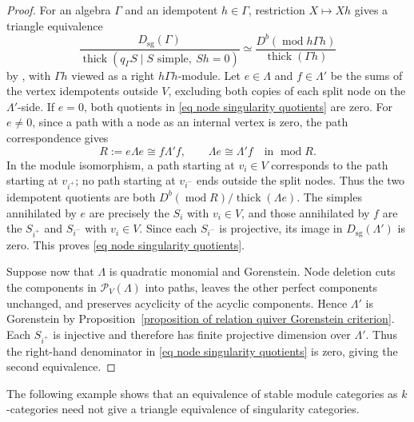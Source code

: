 \documentclass[11pt]{article}
\renewcommand{\mod}{\operatorname{mod}}
\providecommand{\varLambda}{\Lambda}
\providecommand{\varGamma}{\Gamma}
\theoremstyle{definition}
\begin{document}
			\begin{proof}
				For an algebra $\varGamma$ and an idempotent $h\in\varGamma$, restriction $X\mapsto Xh$ gives a triangle equivalence
				\[
					\frac{D_{\mathrm{sg}}(\varGamma)}
					{\operatorname{thick}(q_{\varGamma}S\mid
						S\text{ simple},\ Sh=0)}
					\simeq
					\frac{D^b(\mod h\varGamma h)}
					{\operatorname{thick}(\varGamma h)}
				\]
				by \cite[Proposition~3.3]{KY16}, with $\varGamma h$ viewed as a right $h\varGamma h$-module.
				Let $e\in\varLambda$ and $f\in\varLambda'$ be the sums of the vertex idempotents outside $V$, excluding both copies of each split node on the $\varLambda'$-side. If $e=0$, both quotients in \eqref{eq node singularity quotients} are zero. For $e\ne0$, since a path with a node as an internal vertex is zero, the path correspondence gives
				\[
					R:=e\varLambda e\cong f\varLambda'f,
					\qquad
					\varLambda e\cong\varLambda'f\quad\text{in }\mod R.
				\]
				In the module isomorphism, a path starting at $v_i\in V$ corresponds to the path starting at $v_{i^+}$; no path starting at $v_{i^-}$ ends outside the split nodes.
				Thus the two idempotent quotients are both $D^b(\mod R)/\operatorname{thick}(\varLambda e)$. The simples annihilated by $e$ are precisely the $S_i$ with
				$v_i\in V$, and those annihilated by $f$ are the $S_{i^+}$ and $S_{i^-}$ with $v_i\in V$. Since each $S_{i^-}$ is projective, its image in $D_{\mathrm{sg}}(\varLambda')$ is zero. This proves \eqref{eq node singularity quotients}.

				Suppose now that $\varLambda$ is quadratic monomial and Gorenstein. Node deletion cuts the components in $\mathcal P_V(\varLambda)$ into paths, leaves the other perfect components unchanged, and preserves acyclicity of the acyclic components.
				Hence $\varLambda'$ is Gorenstein by Proposition~\ref{proposition of relation quiver Gorenstein criterion}. Each $S_{i^+}$ is injective and therefore has finite projective dimension over $\varLambda'$. Thus the right-hand denominator in \eqref{eq node singularity quotients} is zero, giving the second equivalence.
			\end{proof}


			The following example shows that an equivalence of stable module
			categories as $k$-categories need not give a triangle equivalence
			of singularity categories.
\end{document}
